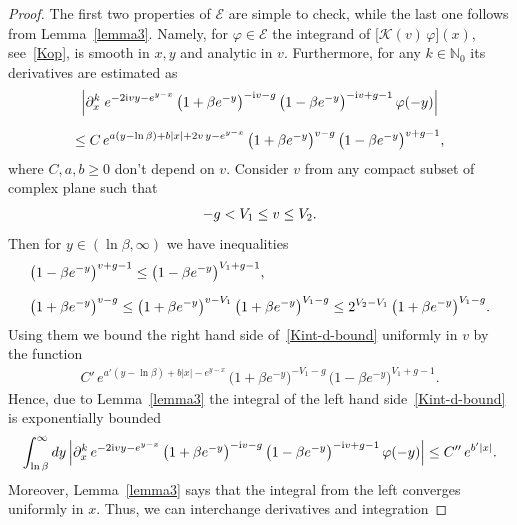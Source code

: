\documentclass[11pt]{article}
\numberwithin{equation}{section}
\theoremstyle{plain}
\theoremstyle{definition}
\let\Im\relax
\DeclareMathOperator{\Im}{Im}
\renewcommand{\phi}{\varphi}
\renewcommand{\imath}{\mathrm{i}}
\begin{document}
\begin{proof}
	The first two properties of $\mathcal{E}$ are simple to check, while the last one follows from Lemma~\ref{lemma3}. Namely, for $\phi \in \mathcal{E}$ the integrand of $\bigl[\mathcal{K}(v) \,\phi \bigr](x)$, see~\eqref{Kop}, is smooth in $x,y$ and analytic in $v$. Furthermore, for any $k \in \mathbb{N}_0$ its derivatives are estimated as
	\begin{multline} \label{Kint-d-bound}
		\Bigl| \partial_x^k \; e^{-2 \imath v y - e^{y -x} } \, \bigl(1 + \beta e^{-y}\bigr)^{- \imath v - g } \, \bigl(1 - \beta e^{-y}\bigr)^{- \imath v + g - 1} \, \phi( - y) \Bigr| \\[6pt]
		\leq C \, e^{a (y - \ln \beta) + b | x | + 2 \Im v \, y - e^{y-x}} \, \bigl(1 + \beta e^{-y}\bigr)^{\Im v - g } \, \bigl(1 - \beta e^{-y}\bigr)^{\Im v + g - 1},
	\end{multline}
	where $C, a, b \geq 0$ don't depend on $v$. Consider $v$ from any compact subset of complex plane such that
	\begin{align}
		-g < V_1 \leq \Im v \leq V_2.
	\end{align}
	Then for $y \in (\ln\beta, \infty)$ we have inequalities
	\begin{align}
		&  \bigl(1 - \beta e^{-y}\bigr)^{\Im v + g - 1} \leq \bigl(1 - \beta e^{-y}\bigr)^{V_1 + g - 1}, \\[6pt]
		& \bigl(1 + \beta e^{-y}\bigr)^{\Im v - g } \leq \bigl(1 + \beta e^{-y}\bigr)^{\Im v - V_1 } \, \bigl(1 + \beta e^{-y}\bigr)^{V_1 - g } \leq 2^{V_2 - V_1} \, \bigl(1 + \beta e^{-y}\bigr)^{V_1 - g }.
	\end{align}
	Using them we bound the right hand side of~\eqref{Kint-d-bound} uniformly in $v$ by the function
	\begin{align}\label{Kint-d-bound2}
		C'\, e^{a' (y - \ln \beta) + b|x| - e^{y-x}} \, \bigl(1 + \beta e^{-y}\bigr)^{-V_1 - g } \, \bigl(1 - \beta e^{-y}\bigr)^{V_1 + g - 1}.
	\end{align}
	Hence, due to Lemma~\ref{lemma3} the integral of the left hand side~\eqref{Kint-d-bound} is exponentially bounded
	\begin{align} \label{Kint-d}
		\int_{\ln\beta}^\infty dy \, \Bigl| \partial_x^k \,e^{-2 \imath v y - e^{y -x} } \, \bigl(1 + \beta e^{-y}\bigr)^{- \imath v - g } \, \bigl(1 - \beta e^{-y}\bigr)^{- \imath v + g - 1} \, \phi( - y) \Bigr| \leq C'' \, e^{ b' |x| }.
	\end{align}
	Moreover, Lemma~\ref{lemma3} says that the integral from the left converges uniformly in $x$. Thus, we can interchange derivatives and integration

\end{proof}
\end{document}

